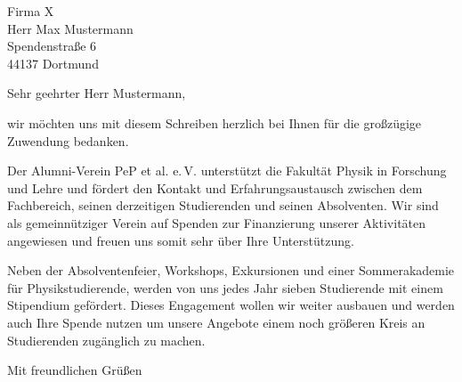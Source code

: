 \documentclass[
  pepbrief,
  fontsize=12pt,
  paper=a4,
  DIV=14,
  parskip=half,
  backaddress=false,
]{scrlttr2}
\author{Lena Linhoff}
\begin{document}
\begin{letter}{%
  Firma X\\
  Herr Max Mustermann\\
  Spendenstraße 6\\
  44137 Dortmund%
}
\opening{Sehr geehrter Herr Mustermann,}
wir möchten uns mit diesem Schreiben herzlich bei Ihnen für die großzügige Zuwendung bedanken.

Der Alumni-Verein PeP et al. e.\,V. unterstützt die Fakultät Physik in Forschung und Lehre und fördert den Kontakt und Erfahrungsaustausch zwischen dem Fachbereich,
seinen derzeitigen Studierenden und seinen Absolventen.
Wir sind als gemeinnütziger Verein auf Spenden zur Finanzierung unserer Aktivitäten angewiesen und freuen uns somit sehr über Ihre Unterstützung.

Neben der Absolventenfeier, Workshops, Exkursionen und einer Sommerakademie für Physikstudierende, werden von uns jedes Jahr sieben Studierende mit einem Stipendium gefördert.
Dieses Engagement wollen wir weiter ausbauen und werden auch Ihre Spende nutzen um unsere Angebote einem noch größeren Kreis an Studierenden zugänglich zu machen.

\closing{Mit freundlichen Grüßen}

\end{letter}
\end{document}
